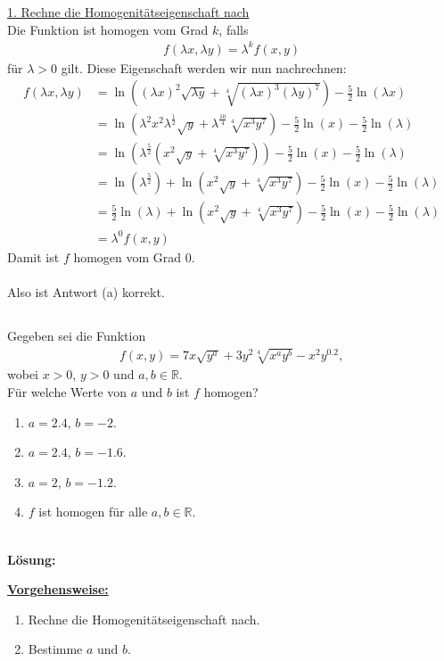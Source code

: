 \underline{1. Rechne die Homogenitätseigenschaft nach}\\
Die Funktion ist homogen vom Grad $ k $, falls 
\begin{align*}
f(\lambda x, \lambda y) = \lambda^k f(x,y)
\end{align*}
für $ \lambda > 0 $ gilt. Diese Eigenschaft werden wir nun nachrechnen:
\begin{align*}
f(\lambda x, \lambda y) &= 
\ln \left( 
(\lambda x)^2 \sqrt{\lambda y} + \sqrt[4]{(\lambda x)^3 (\lambda y)^7} 
\right)
- \frac{5}{2} \ln(\lambda x )\\
&=
\ln \left( 
\lambda^2 x^2 \lambda^{\frac{1}{2}} \sqrt{ y} +  \lambda^{\frac{10}{4}} \sqrt[4]{ x^3  y^7} 
\right)
- \frac{5}{2} \ln( x ) - \frac{5}{2} \ln(\lambda  )\\
&=
\ln \left( 
\lambda^{\frac{5}{2}} \left( x^2  \sqrt{ y} +   \sqrt[4]{ x^3  y^7} 
\right) \right)
- \frac{5}{2} \ln( x ) - \frac{5}{2} \ln(\lambda  )\\
&=
\ln\left(\lambda^{\frac{5}{2}} \right)+
\ln \left( 
 x^2 \sqrt{ y} +   \sqrt[4]{ x^3  y^7} \right) 
- \frac{5}{2} \ln( x ) - \frac{5}{2} \ln(\lambda  )\\ 
&=
\frac{5}{2}\ln\left(\lambda \right)+
\ln \left( 
x^2 \sqrt{ y} +   \sqrt[4]{ x^3  y^7} \right) 
- \frac{5}{2} \ln( x ) - \frac{5}{2} \ln(\lambda  )\\
&= \lambda^0 f(x,y)
\end{align*}
Damit ist $ f  $ homogen vom Grad $ 0 $.\\
\\
Also ist Antwort (a) korrekt.
\newpage

\subsection*{}
Gegeben sei die Funktion
\begin{align*}
f(x,y) = 
7x\sqrt{y^a} + 3y^2 \sqrt[4]{x^a y^b} - x^2 y^{0.2},
\end{align*}
wobei $ x > 0 $, $ y > 0 $ und $ a,b \in \mathbb{R} $.\\
Für welche Werte von $ a $ und $ b $ ist $ f  $ homogen?
\renewcommand{\labelenumi}{(\alph{enumi})}
\begin{enumerate}
	\item 
	$a = 2.4$, $ b = -2 $.
	\item
	$a = 2.4$, $ b = -1.6 $.
	\item
	$a = 2$, $ b = -1.2 $.
	\item
	$ f  $ ist homogen für alle $ a,b \in \mathbb{R} $.
\end{enumerate}\
\\
\textbf{Lösung:}
\begin{mdframed}
\underline{\textbf{Vorgehensweise:}}
\renewcommand{\labelenumi}{\theenumi.}
\begin{enumerate}
\item Rechne die Homogenitätseigenschaft nach.
\item Bestimme $ a  $ und $ b $.
\end{enumerate}
\end{mdframed}

